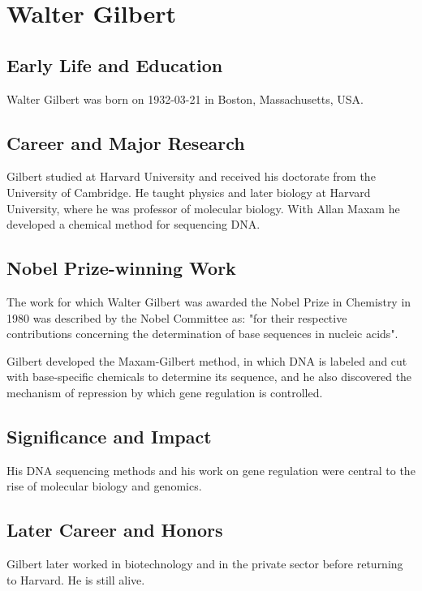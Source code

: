\clearpage

\section{Walter Gilbert}

\subsection*{Early Life and Education}

Walter Gilbert was born on 1932-03-21 in Boston, Massachusetts, USA.

\subsection*{Career and Major Research}

Gilbert studied at Harvard University and received his doctorate from the University of Cambridge. He taught physics and later biology at Harvard University, where he was professor of molecular biology. With Allan Maxam he developed a chemical method for sequencing DNA.

\subsection*{Nobel Prize-winning Work}

The work for which Walter Gilbert was awarded the Nobel Prize in Chemistry in 1980 was described by the Nobel Committee as: "for their respective contributions concerning the determination of base sequences in nucleic acids".

Gilbert developed the Maxam-Gilbert method, in which DNA is labeled and cut with base-specific chemicals to determine its sequence, and he also discovered the mechanism of repression by which gene regulation is controlled.

\subsection*{Significance and Impact}

His DNA sequencing methods and his work on gene regulation were central to the rise of molecular biology and genomics.

\subsection*{Later Career and Honors}

Gilbert later worked in biotechnology and in the private sector before returning to Harvard. He is still alive.

